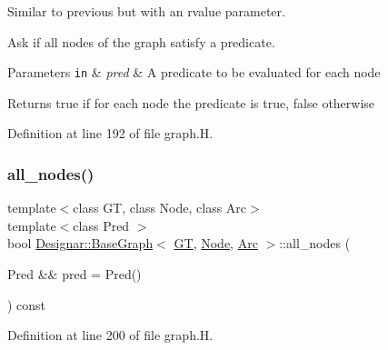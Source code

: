 Similar to previous but with an rvalue parameter. 

Ask if all nodes of the graph satisfy a predicate.


\begin{DoxyParams}[1]{Parameters}
\mbox{\tt in}  & {\em pred} & A predicate to be evaluated for each node \\
\hline
\end{DoxyParams}
\begin{DoxyReturn}{Returns}
{\ttfamily true} if for each node the predicate is true, {\ttfamily false} otherwise 
\end{DoxyReturn}


Definition at line 192 of file graph.\+H.

\mbox{\label{class_designar_1_1_base_graph_a32419ec17712a60c1964bc91e78d135c}} 
\subsubsection{\texorpdfstring{all\+\_\+nodes()}{all\_nodes()}\hspace{0.1cm}{\footnotesize\ttfamily [2/2]}}
{\footnotesize\ttfamily template$<$class GT, class Node, class Arc$>$ \\
template$<$class Pred $>$ \\
bool \hyperlink{class_designar_1_1_base_graph}{Designar\+::\+Base\+Graph}$<$ \hyperlink{demo-buildgraph_8_c_a3001c40d2c31ca87ed96cd7d1334a55e}{GT}, \hyperlink{namespace_designar_a5af326c65aa2bd26b26c410f2030d09e}{Node}, \hyperlink{namespace_designar_a3f55fb5513d62ff47cbc8f72b8e95d6f}{Arc} $>$\+::all\+\_\+nodes (\begin{DoxyParamCaption}\item[{Pred \&\&}]{pred = {\ttfamily Pred()} }\end{DoxyParamCaption}) const\hspace{0.3cm}{\ttfamily [inline]}}



Definition at line 200 of file graph.\+H.

\mbox{\label{class_designar_1_1_base_graph_af9d306a0474e8e3b38b7bd697b844d11}} 

